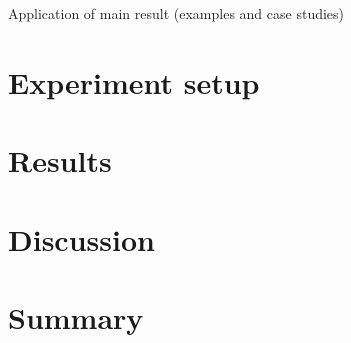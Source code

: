 Application of main result (examples and case studies)
\section{Experiment setup}
\section{Results}
\section{Discussion}
\section{Summary}
